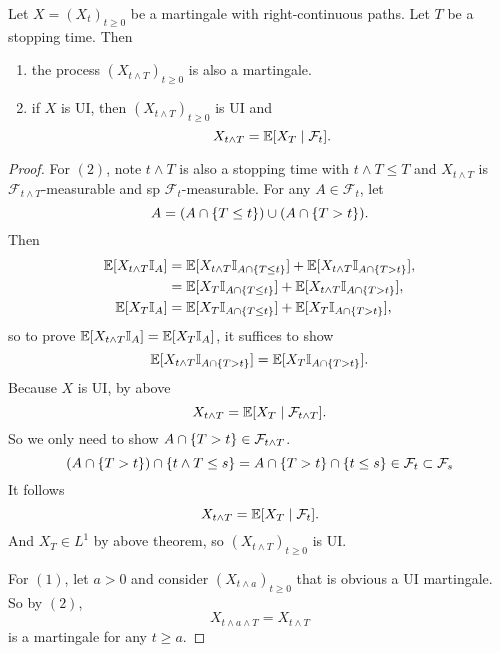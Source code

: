 \begin{cor}
    Let $X = (X_t)_{t \geq 0}$ be a martingale with right-continuous paths. Let $T$ be a stopping time. Then
    \begin{enumerate}[label=(\arabic{*})]
        \item the process $(X_{t \wedge T})_{t \geq 0}$ is also a martingale.
        \item if $X$ is UI, then $(X_{t \wedge T})_{t \geq 0}$ is UI and
        \begin{equation*}
            X_{t \wedge T} = \mathbb{E}[X_T \mid \mathcal{F}_t].
        \end{equation*}
    \end{enumerate}
\end{cor}
\begin{proof}
    For $(2)$, note $t \wedge T$ is also a stopping time with $t \wedge T \leq T$ and $X_{t \wedge T}$ is $\mathcal{F}_{t \wedge T}$-measurable and sp $\mathcal{F}_t$-measurable. For any $A \in \mathcal{F}_t$, let
    \begin{equation*}
        A = (A \cap \left\{T \leq t\right\}) \cup (A \cap \left\{T > t\right\}).
    \end{equation*}
    Then
    \begin{align*}
        \mathbb{E}[X_{t \wedge T} \mathbb{I}_A] &= \mathbb{E}[X_{t \wedge T} \mathbb{I}_{A \cap \left\{T \leq t\right\}}] + \mathbb{E}[X_{t \wedge T} \mathbb{I}_{A \cap \left\{T > t\right\}}],\\
        &= \mathbb{E}[X_{T} \mathbb{I}_{A \cap \left\{T \leq t\right\}}] + \mathbb{E}[X_{t \wedge T} \mathbb{I}_{A \cap \left\{T > t\right\}}],\\
        \mathbb{E}[X_{T} \mathbb{I}_A] &= \mathbb{E}[X_{T} \mathbb{I}_{A \cap \left\{T \leq t\right\}}] + \mathbb{E}[X_{T} \mathbb{I}_{A \cap \left\{T > t\right\}}],
    \end{align*}
    so to prove $\mathbb{E}[X_{t \wedge T} \mathbb{I}_A] = \mathbb{E}[X_{T} \mathbb{I}_A]$, it suffices to show
    \begin{equation*}
        \mathbb{E}[X_{t \wedge T} \mathbb{I}_{A \cap \left\{T > t\right\}}] = \mathbb{E}[X_{T} \mathbb{I}_{A \cap \left\{T > t\right\}}].
    \end{equation*}
    Because $X$ is UI, by above
    \begin{equation*}
        X_{t \wedge T} = \mathbb{E}[X_T \mid \mathcal{F}_{t \wedge T}].
    \end{equation*}
    So we only need to show $A \cap \left\{T > t\right\} \in \mathcal{F}_{t \wedge T}$.
    \begin{equation*}
        (A \cap \left\{T > t\right\}) \cap \left\{t \wedge T \leq s\right\} = A \cap \left\{T > t\right\} \cap \left\{t \leq s\right\} \in \mathcal{F}_t \subset \mathcal{F}_s
    \end{equation*}
    It follows
    \begin{equation*}
        X_{t \wedge T} = \mathbb{E}[X_T \mid \mathcal{F}_t].
    \end{equation*}
    And $X_T \in L^1$ by above theorem, so $(X_{t \wedge T})_{t \geq 0}$ is UI.

    \noindent For $(1)$, let $a > 0$ and consider $(X_{t \wedge a})_{t \geq 0}$ that is obvious a UI martingale. So by $(2)$,
    \begin{equation*}
        X_{t \wedge a \wedge T} = X_{t \wedge T}
    \end{equation*}
    is a martingale for any $t \geq a$.
\end{proof}
